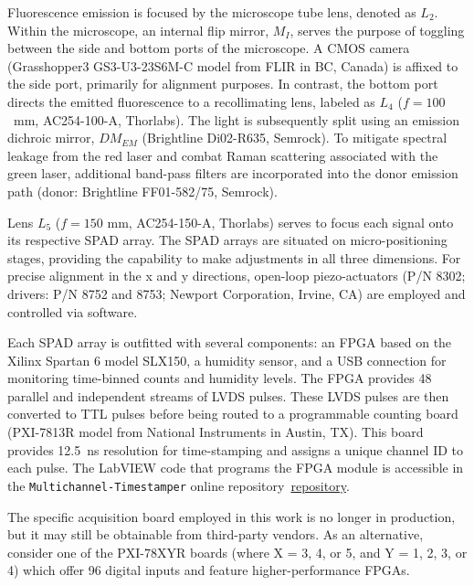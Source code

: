 Fluorescence emission is focused by the microscope tube lens, denoted as $L_2$. 
Within the microscope, an internal flip mirror, $M_I$, serves the purpose of toggling between the side and bottom ports of the microscope. 
A \ac{CMOS} camera (Grasshopper3 GS3-U3-23S6M-C model from FLIR in BC, Canada) is affixed to the side port, primarily for alignment purposes. 
In contrast, the bottom port directs the emitted fluorescence to a recollimating lens, labeled as $L_4$ ($f = 100$~mm, AC254-100-A, Thorlabs). 
The light is subsequently split using an emission dichroic mirror, $DM_{EM}$ (Brightline Di02-R635, Semrock). 
To mitigate spectral leakage from the red laser and combat Raman scattering associated with the green laser, additional band-pass filters are incorporated into the donor emission path (donor: Brightline FF01-582/75, Semrock).

Lens $L_{5}$ ($f = 150$ mm, AC254-150-A, Thorlabs) serves to focus each signal onto its respective \ac{SPAD} array. 
The \ac{SPAD} arrays are situated on micro-positioning stages, providing the capability to make adjustments in all three dimensions. 
For precise alignment in the x and y directions, open-loop piezo-actuators (P/N 8302; drivers: P/N 8752 and 8753; Newport Corporation, Irvine, CA) are employed and controlled via software.

Each SPAD array is outfitted with several components: an \ac{FPGA} based on the Xilinx Spartan 6 model SLX150, a humidity sensor, and a USB connection for monitoring time-binned counts and humidity levels. 
The \ac{FPGA} provides 48 parallel and independent streams of \ac{LVDS} pulses. 
These \ac{LVDS} pulses are then converted to \ac{TTL} pulses before being routed to a programmable counting board (PXI-7813R model from National Instruments in Austin, TX). 
This board provides 12.5~ns resolution for time-stamping and assigns a unique channel ID to each pulse. 
The LabVIEW code that programs the \ac{FPGA} module is accessible in the \texttt{Multichannel-Timestamper} online repository~\href{https://github.com/multispot-software/MultichannelTimestamper}{repository}.

The specific acquisition board employed in this work is no longer in production, but it may still be obtainable from third-party vendors. 
As an alternative, consider one of the PXI-78XYR boards (where X = 3, 4, or 5, and Y = 1, 2, 3, or 4) which offer 96 digital inputs and feature higher-performance \ac{FPGA}s.
